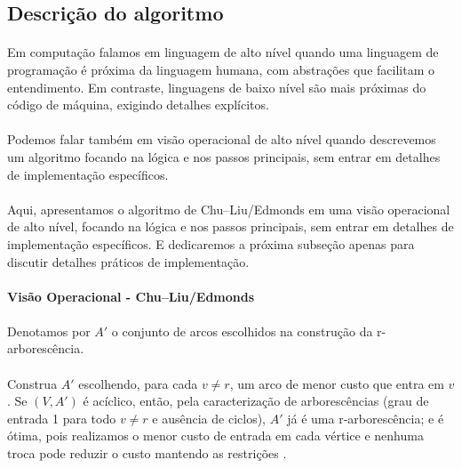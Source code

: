 \documentclass[12pt,a4paper]{article}
\def\emph#1{#1}%
\begin{document}
\subsection{Descrição do algoritmo}

\paragraph{}
Em computação falamos em linguagem de alto nível quando uma linguagem de programação é próxima da linguagem humana, com abstrações que facilitam o entendimento. Em contraste, linguagens de baixo nível são mais próximas do código de máquina, exigindo detalhes explícitos. 

\paragraph{}
Podemos falar também em visão operacional de alto nível quando descrevemos um algoritmo focando na lógica e nos passos principais, sem entrar em detalhes de implementação específicos.

\paragraph{}
Aqui, apresentamos o algoritmo de Chu–Liu/Edmonds em uma visão operacional de alto nível, focando na lógica e nos passos principais, sem entrar em detalhes de implementação específicos. E dedicaremos a próxima subseção apenas para discutir detalhes práticos de implementação.

\paragraph{Visão Operacional - Chu–Liu/Edmonds}
\paragraph{}
Denotamos por \(A'\) o conjunto de arcos escolhidos na construção da r-arborescência. 

\paragraph{}
Construa \(A'\) escolhendo, para cada \(v\neq r\), um arco de menor custo que \emph{entra} em \(v\). Se \((V,A')\) é acíclico, então, pela caracterização de arborescências (grau de entrada 1 para todo \(v\neq r\) e ausência de ciclos), \(A'\) já é uma r‑arborescência; e é \emph{ótima}, pois realizamos o menor custo de entrada em cada vértice e nenhuma troca pode reduzir o custo mantendo as restrições \cite[Sec.~4.9]{kleinberg2006}. 
\end{document}
